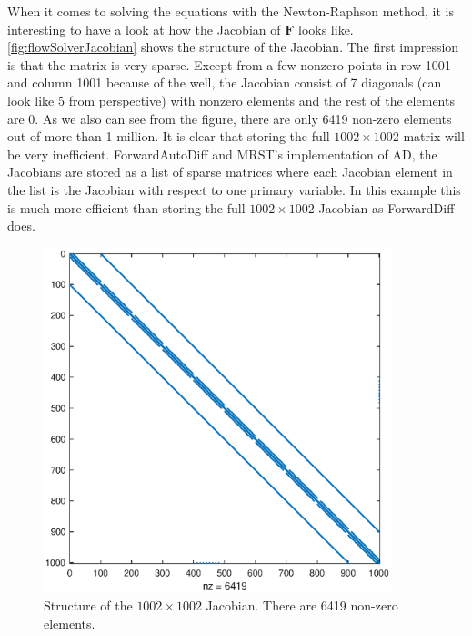 When it comes to solving the equations with the Newton-Raphson method, it is interesting to have a look at how the Jacobian of $\boldsymbol{F}$ looks like. \autoref{fig:flowSolverJacobian} shows the structure of the Jacobian. The first impression is that the matrix is very sparse. Except from a few nonzero points in row 1001 and column 1001 because of the well, the Jacobian consist of 7 diagonals (can look like 5 from perspective) with nonzero elements and the rest of the elements are 0. As we also can see from the figure, there are only 6419 non-zero elements out of more than 1 million. It is clear that storing the full $1002\times 1002$ matrix will be very inefficient. ForwardAutoDiff and MRST's implementation of AD, the Jacobians are stored as a list of sparse matrices where each Jacobian element in the list is the Jacobian with respect to one primary variable. In this example this is much more efficient than storing the full $1002\times 1002$ Jacobian as ForwardDiff does.


\begin{figure}[htbp]
    \centering
    \includegraphics[width = 0.9\textwidth]{figures/flowSolver_Jacobian.eps}
    \caption{Structure of the $1002\times 1002$ Jacobian. There are 6419 non-zero elements.}
    \label{fig:flowSolverJacobian}
\end{figure}